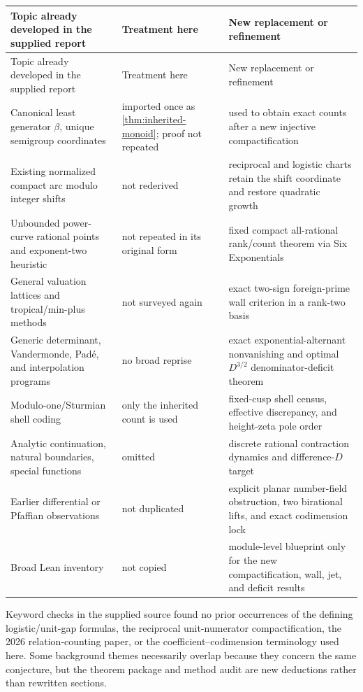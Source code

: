 \documentclass[10pt,oneside]{article}
\theoremstyle{definition}
\theoremstyle{remark}
\begin{document}
\begin{center}
\small
\begin{longtable}{p{}p{}p{}}
\toprule
Topic already developed in the supplied report & Treatment here & New replacement or refinement \\
\midrule
\endfirsthead
\toprule
Topic already developed in the supplied report & Treatment here & New replacement or refinement \\
\midrule
\endhead
Canonical least generator \(\beta\), unique semigroup coordinates & imported once as \cref{thm:inherited-monoid}; proof not repeated & used to obtain exact counts after a new injective compactification \\
Existing normalized compact arc modulo integer shifts & not rederived & reciprocal and logistic charts retain the shift coordinate and restore quadratic growth \\
Unbounded power-curve rational points and exponent-two heuristic & not repeated in its original form & fixed compact all-rational rank/count theorem via Six Exponentials \\
General valuation lattices and tropical/min-plus methods & not surveyed again & exact two-sign foreign-prime wall criterion in a rank-two basis \\
Generic determinant, Vandermonde, Pad\'e, and interpolation programs & no broad reprise & exact exponential-alternant nonvanishing and optimal \(D^{3/2}\) denominator-deficit theorem \\
Modulo-one/Sturmian shell coding & only the inherited count is used & fixed-cusp shell census, effective discrepancy, and height-zeta pole order \\
Analytic continuation, natural boundaries, special functions & omitted & discrete rational contraction dynamics and difference-\(D\) target \\
Earlier differential or Pfaffian observations & not duplicated & explicit planar number-field obstruction, two birational lifts, and exact codimension lock \\
Broad Lean inventory & not copied & module-level blueprint only for the new compactification, wall, jet, and deficit results \\
\bottomrule
\end{longtable}
\end{center}

Keyword checks in the supplied source found no prior occurrences of the defining logistic/unit-gap formulas, the reciprocal unit-numerator compactification, the 2026 relation-counting paper, or the coefficient--codimension terminology used here.  Some background themes necessarily overlap because they concern the same conjecture, but the theorem package and method audit are new deductions rather than rewritten sections.
\end{document}
